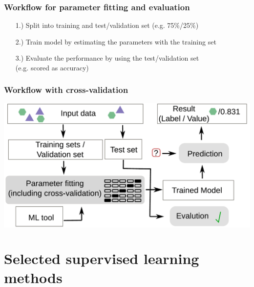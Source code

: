 \documentclass[aspectratio=169]{beamer}
\begin{document}
\begin{frame}
  \frametitle{Workflow for parameter fitting and evaluation}
  \begin{block}{}
    \begin{center}
      \begin{itemize}
      \item[1.)] Split into training and test/validation set (e.g. 75\%/25\%)
      \item[2.)] Train model by estimating the parameters with the training set
      \item[3.)] Evaluate the performance by using the test/validation
        set \\(e.g. scored as accuracy)
      \end{itemize}
    \end{center}    
  \end{block}
\end{frame}


\begin{frame}
  \frametitle{Workflow with cross-validation}
  \begin{center}
    \includegraphics[width=14cm]{images/workflow_training_test_set.pdf}
  \end{center}    
\end{frame}


\section{Selected supervised learning methods}

\begin{frame}{}
   \tableofcontents[currentsection]
\end{frame}
\end{document}
